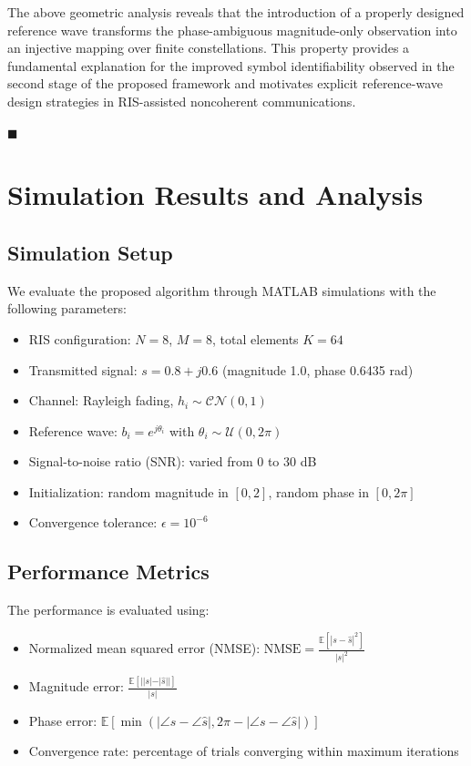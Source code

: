 \documentclass[journal]{IEEEtran}
\newcommand{\E}{\mathbb{E}}
\begin{document}
The above geometric analysis reveals that the introduction of a properly designed reference wave transforms the phase-ambiguous magnitude-only observation into an injective mapping over finite constellations.
This property provides a fundamental explanation for the improved symbol identifiability observed in the second stage of the proposed framework and motivates explicit reference-wave design strategies in RIS-assisted noncoherent communications.

\hfill$\blacksquare$

\section{Simulation Results and Analysis}
\label{sec:simulation}

\subsection{Simulation Setup}
We evaluate the proposed algorithm through MATLAB simulations with the following parameters:
\begin{itemize}
\item RIS configuration: $N = 8$, $M = 8$, total elements $K = 64$
\item Transmitted signal: $s = 0.8 + j0.6$ (magnitude 1.0, phase 0.6435 rad)
\item Channel: Rayleigh fading, $h_i \sim \mathcal{CN}(0,1)$
\item Reference wave: $b_i = e^{j\theta_i}$ with $\theta_i \sim \mathcal{U}(0,2\pi)$
\item Signal-to-noise ratio (SNR): varied from 0 to 30 dB
\item Initialization: random magnitude in $[0,2]$, random phase in $[0,2\pi]$
\item Convergence tolerance: $\epsilon = 10^{-6}$
\end{itemize}

\subsection{Performance Metrics}
The performance is evaluated using:
\begin{itemize}
\item Normalized mean squared error (NMSE): $\text{NMSE} = \frac{\E[|s - \hat{s}|^2]}{|s|^2}$
\item Magnitude error: $\frac{\E[||s| - |\hat{s}||]}{|s|}$
\item Phase error: $\E[\min(|\angle s - \angle \hat{s}|, 2\pi - |\angle s - \angle \hat{s}|)]$
\item Convergence rate: percentage of trials converging within maximum iterations
\end{itemize}
\end{document}
